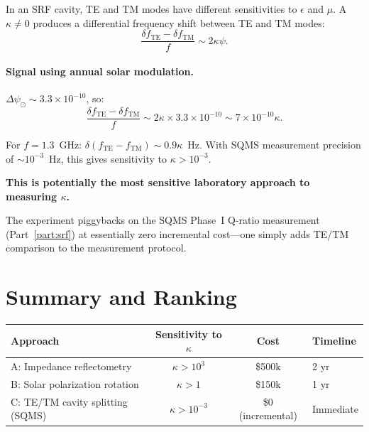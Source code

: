 \documentclass[11pt]{article}
\newcommand{\ee}[1]{\times 10^{#1}}
\begin{document}
In an SRF cavity, TE and TM modes have different sensitivities to
$\epsilon$ and $\mu$.  A $\kappa \neq 0$ produces a differential
frequency shift between TE and TM modes:
\begin{equation}
\frac{\delta f_{\text{TE}} - \delta f_{\text{TM}}}{f}
\sim 2\kappa\psi.
\end{equation}

\paragraph{Signal using annual solar modulation.}
$\Delta\psi_\odot \sim 3.3\ee{-10}$, so:
\begin{equation}
\frac{\delta f_{\text{TE}} - \delta f_{\text{TM}}}{f}
\sim 2\kappa \times 3.3\ee{-10} \sim 7\ee{-10}\kappa.
\end{equation}

For $f = 1.3$~GHz: $\delta(f_{\text{TE}} - f_{\text{TM}}) \sim
0.9\kappa$~Hz.  With SQMS measurement precision of $\sim 10^{-3}$~Hz,
this gives sensitivity to $\kappa > 10^{-3}$.

\textbf{This is potentially the most sensitive laboratory approach
to measuring $\kappa$.}

The experiment piggybacks on the SQMS Phase~I Q-ratio measurement
(Part~\ref{part:srf}) at essentially zero incremental cost---one
simply adds TE/TM comparison to the measurement protocol.

\section{Summary and Ranking}
\label{sec:vacuum-em-summary}

\begin{center}
\begin{tabular}{lccl}
\toprule
\textbf{Approach} & \textbf{Sensitivity to $\kappa$}
& \textbf{Cost} & \textbf{Timeline} \\
\midrule
A: Impedance reflectometry & $\kappa > 10^3$ & \$500k & 2 yr \\
B: Solar polarization rotation & $\kappa > 1$ & \$150k & 1 yr \\
C: TE/TM cavity splitting (SQMS) & $\kappa > 10^{-3}$ &
  \$0 (incremental) & Immediate \\
\bottomrule
\end{tabular}
\end{center}
\end{document}
